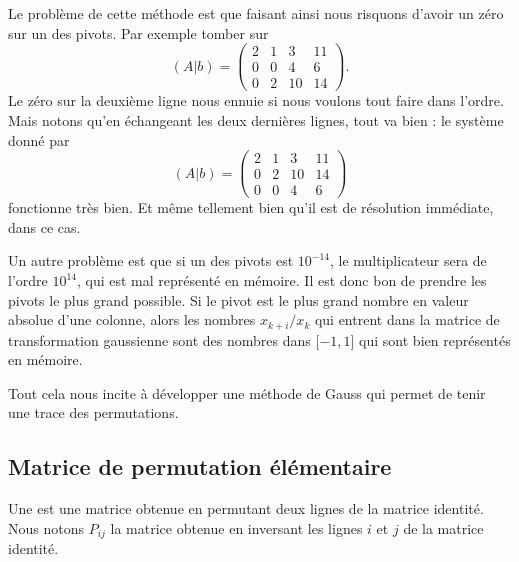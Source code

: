 Le problème de cette méthode est que faisant ainsi nous risquons d'avoir un zéro sur un des pivots. Par exemple tomber sur
\begin{equation}
    (A|b)=\begin{pmatrix}
         2   &   1    &   3    &   11    \\
         0   &   0    &   4    &   6    \\
         0   &   2    &   10    &   14
     \end{pmatrix}.
\end{equation}
Le zéro sur la deuxième ligne nous ennuie si nous voulons tout faire dans l'ordre. Mais notons qu'en échangeant les deux dernières lignes, tout va bien : le système donné par
\begin{equation}
    (A|b)=\begin{pmatrix}
         2   &   1    &   3    &   11    \\
         0   &   2    &   10    &   14\\
         0   &   0    &   4    &   6
     \end{pmatrix}
\end{equation}
fonctionne très bien. Et même tellement bien qu'il est de résolution immédiate, dans ce cas.

Un autre problème est que si un des pivots est \( 10^{-14}\), le multiplicateur sera de l'ordre \( 10^{14}\), qui est mal représenté en mémoire. Il est donc bon de prendre les pivots le plus grand possible. Si le pivot est le plus grand nombre en valeur absolue d'une colonne, alors les nombres \( x_{k+i}/x_k\) qui entrent dans la matrice de transformation gaussienne sont des nombres dans \( \mathopen[ -1 , 1 \mathclose]\) qui sont bien représentés en mémoire.

Tout cela nous incite à développer une méthode de Gauss qui permet de tenir une trace des permutations.

\subsection{Matrice de permutation élémentaire}

\begin{definition}
    Une  est une matrice obtenue en permutant deux lignes de la matrice identité. Nous notons \( P_{ij}\) la matrice obtenue en inversant les lignes \( i\) et \( j\) de la matrice identité.
\end{definition}

